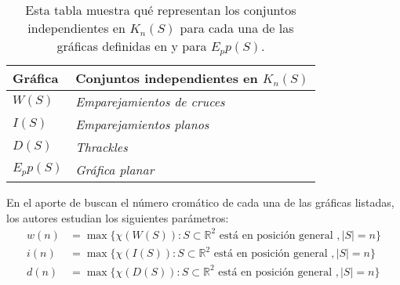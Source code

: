 %
\begin{table}
  \centering
  \begin{tabular}{|l|l|}
    \hline
    Gráfica   & Conjuntos independientes en $K_n(S)$    \\ \hline \hline
    $W(S)$    & \emph{Emparejamientos de cruces}        \\ \hline
    $I(S)$    & \emph{Emparejamientos planos}           \\ \hline
    $D(S)$    & \emph{Thrackles}                        \\ \hline
    $E_pp(S)$ & \emph{Gráfica planar}                   \\ \hline
  \end{tabular}
  \caption{Esta tabla muestra qué representan los conjuntos independientes en $K_n(S)$
  para cada una de las gráficas definidas en \cite{Araujo2005} y para $E_pp(S)$.}
  \label{table:graficasincidencia}
\end{table}
En el aporte de \cite{Araujo2005} buscan el número cromático de cada una de las
gráficas listadas, los autores estudian los siguientes parámetros:
  \begin{align*}
    w(n) &= \max\{\chi(W(S)): S\subset \mathbb{R}^2 \text{ está en posición general }, |S|=n\} \\
    i(n) &= \max\{\chi(I(S)): S\subset \mathbb{R}^2 \text{ está en posición general }, |S|=n\} \\
    d(n) &= \max\{\chi(D(S)): S\subset \mathbb{R}^2 \text{ está en posición general }, |S|=n\} \\
  \end{align*}
